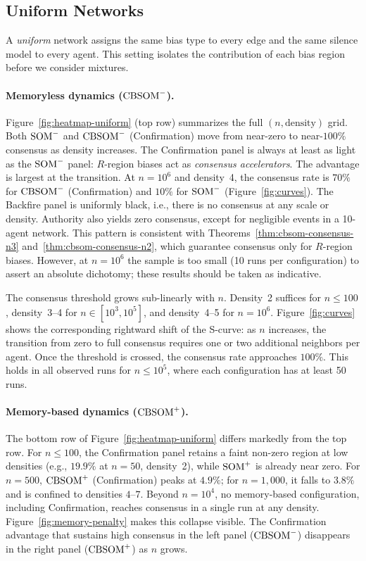 \subsection{Uniform Networks}
\label{sec:exp-uniform}

A \emph{uniform} network assigns the same bias type to every edge and
the same silence model to every agent. This setting isolates the
contribution of each bias region before we consider mixtures.

\paragraph{Memoryless dynamics ($\mathrm{CBSOM}^{-}$).}
Figure~\ref{fig:heatmap-uniform} (top row) summarizes the full
$(n,\text{density})$ grid. Both $\mathrm{SOM}^{-}$ and $\mathrm{CBSOM}^{-}$
(Confirmation) move from near-zero to near-$100\%$ consensus as
density increases. The Confirmation panel is always at least as light
as the $\mathrm{SOM}^{-}$ panel: $R$-region biases act as
\emph{consensus accelerators}. The advantage is largest at the
transition. At $n=10^6$ and density~4, the consensus rate is $70\%$ for
$\mathrm{CBSOM}^{-}$ (Confirmation) and $10\%$ for $\mathrm{SOM}^{-}$
(Figure~\ref{fig:curves}).
The Backfire panel is uniformly black, i.e., there is no consensus at any
scale or density. Authority also yields zero consensus, except for
negligible events in a 10-agent network. This pattern is consistent with
Theorems~\ref{thm:cbsom-consensus-n3} and~\ref{thm:cbsom-consensus-n2},
which guarantee consensus only for $R$-region biases. However, at
$n=10^6$ the sample is too small (10 runs per configuration) to assert
an absolute dichotomy; these results should be taken as indicative.

The consensus threshold grows sub-linearly with $n$. Density~2 suffices
for $n \le 100$, density~3--4 for $n \in [10^3, 10^5]$, and density~4--5
for $n=10^6$. Figure~\ref{fig:curves} shows the corresponding rightward
shift of the S-curve: as $n$ increases, the transition from zero to full
consensus requires one or two additional neighbors per agent. Once the
threshold is crossed, the consensus rate approaches $100\%$. This holds
in all observed runs for $n \le 10^5$, where each configuration has at
least 50 runs.

\paragraph{Memory-based dynamics ($\mathrm{CBSOM}^{+}$).}
The bottom row of Figure~\ref{fig:heatmap-uniform} differs markedly
from the top row. For $n \le 100$, the Confirmation panel retains a faint
non-zero region at low densities (e.g., $19.9\%$ at $n=50$,
density~2), while $\mathrm{SOM}^{+}$ is already near zero.
For $n=500$, $\mathrm{CBSOM}^{+}$ (Confirmation) peaks at $4.9\%$; for
$n=1{,}000$, it falls to $3.8\%$ and is confined to densities $4$--$7$.
Beyond $n=10^4$, no memory-based configuration, including Confirmation,
reaches consensus in a single run at any density.
Figure~\ref{fig:memory-penalty} makes this collapse visible. The
Confirmation advantage that sustains high consensus in the left panel
($\mathrm{CBSOM}^{-}$) disappears in the right panel ($\mathrm{CBSOM}^{+}$)
as $n$ grows.

